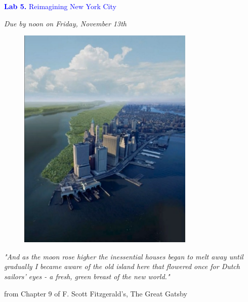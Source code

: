 \documentclass{article}
\begin{document}
\vspace*{.01mm}

\begin{center}

\Large{\textcolor{blue}{\textbf{Lab 5.}  Reimagining New York City}}

\vspace{4mm}

\textit{Due by noon on Friday, November 13th}\\

\end{center}

\begin{figure}[h!]
\begin{center}
\includegraphics[width=0.75\textwidth]{nyc.png}

\end{center}
\end{figure}

\setlength{\parindent}{0cm}

\large{\textit{"And as the moon rose higher the inessential houses began to melt away until gradually I became aware of the old island here that flowered once for Dutch sailors' eyes - a fresh, green breast of the new world."}
\begin{flushright}
from Chapter 9 of F. Scott Fitzgerald's, The Great Gatsby
\end{flushright}
}
\end{document}
